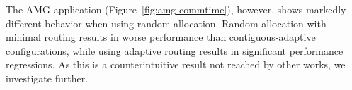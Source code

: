 The AMG application (Figure~\ref{fig:amg-commtime}), however, shows markedly
different behavior when using random allocation. Random allocation with minimal
routing results in worse performance than contiguous-adaptive configurations,
while using adaptive routing results in significant performance regressions. As
this is a counterintuitive result not reached by other works, we investigate
further.

\begin{comment} JJ - doing some reorg, so keeping the old text just in case
Now that the system-level view has been analyzed, we turn to evaluate the behavior of each application within Workload~\Rmnum{1}.
Figure~\ref{fig:apps-commtime} shows the communication time distribution across application ranks for different placement and routing configurations.
As shown in Figure~\ref{fig:mg-commtime}, 
MultiGrid takes the most communication time when it is running with contiguous placement and minimal routing (CM). 
When contiguous placement coupled with adaptive or progressive adaptive routing (CA, CPA) are in use, 
the communication time is significantly reduced. 
Random placement coupled with minimal routing (RM) can make further improvement, 
and reaches the best performance(lowest communication time) when coupled with adaptive and progressive adaptive routing(RA, RPA). 
Due to the variance of data transfer amount among MPI ranks, 
MultiGrid communication time also presents great variation, 
indicating by the long boxes in Figure~\ref{fig:mg-commtime}.

CrystalRouter takes more communication time compared with the other applications because of its high volume of data transfer. 
When it is running with six placement and routing configurations, 
CrystalRouter communication time presents similarly trend as MultiGrid but with little variance, shown in Figure~\ref{fig:cr-commtime}. 


AMG is quite an exception. 
The communication time of AMG running with different placement and routing configuration are shown in Figure~\ref{fig:amg-commtime}.
When contiguous placement is in use, AMG behaves similarly as MultiGrid and CrystalRouter over three routing policies. 
It takes comparable amount of communication time when contiguous placement coupled with adaptive and progressive routing. 
When coupled with minimal routing, the communication time almost doubles. 
The communication time skyrockets when random placement coupled with (progressive) adaptive routing (RPA, RA) are in use. Minimal routing (RM) can mitigate this performance degradation, but still worse than CA and CPA. We observe that when Workload~\Rmnum{1} is running with random placement and (progressive) adaptive routing, 
the performance of MultiGrid and CrystalRouter are significant improved, whereas AMG suffers performance degradation. 
\end{comment}


